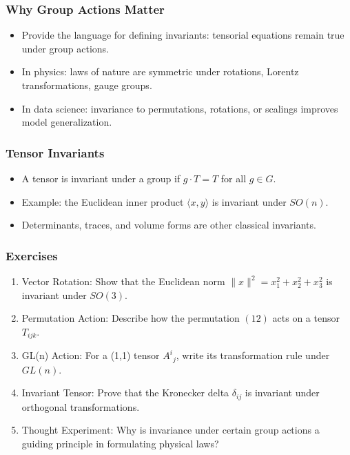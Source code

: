 \documentclass[
  letterpaper,
  DIV=11,
  numbers=noendperiod]{scrreprt}
\providecommand{\tightlist}{%
  \setlength{\itemsep}{0pt}\setlength{\parskip}{0pt}}
\begin{document}
\subsubsection{Why Group Actions Matter}\label{why-group-actions-matter}

\begin{itemize}
\tightlist
\item
  Provide the language for defining invariants: tensorial equations
  remain true under group actions.
\item
  In physics: laws of nature are symmetric under rotations, Lorentz
  transformations, gauge groups.
\item
  In data science: invariance to permutations, rotations, or scalings
  improves model generalization.
\end{itemize}

\subsubsection{Tensor Invariants}\label{tensor-invariants}

\begin{itemize}
\tightlist
\item
  A tensor is invariant under a group if \(g \cdot T = T\) for all
  \(g \in G\).
\item
  Example: the Euclidean inner product \(\langle x,y\rangle\) is
  invariant under \(SO(n)\).
\item
  Determinants, traces, and volume forms are other classical invariants.
\end{itemize}

\subsubsection{Exercises}\label{exercises-72}

\begin{enumerate}
\def\labelenumi{\arabic{enumi}.}
\item
  Vector Rotation: Show that the Euclidean norm
  \(\|x\|^2 = x_1^2 + x_2^2 + x_3^2\) is invariant under \(SO(3)\).
\item
  Permutation Action: Describe how the permutation \((12)\) acts on a
  tensor \(T_{ijk}\).
\item
  GL(n) Action: For a (1,1) tensor \(A^i{}_j\), write its transformation
  rule under \(GL(n)\).
\item
  Invariant Tensor: Prove that the Kronecker delta \(\delta_{ij}\) is
  invariant under orthogonal transformations.
\item
  Thought Experiment: Why is invariance under certain group actions a
  guiding principle in formulating physical laws?
\end{enumerate}
\end{document}
